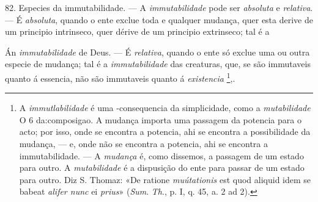 82. Especies da immutabilidade. --- A \emph{immutabilidade} pode ser \emph{absoluta} e \emph{relativa}. --- É \emph{absoluta}, quando o ente exclue toda e qualquer mudança, quer esta derive de um principio intrinseco, quer dérive de um principio extrinseco; tal é a

Án \emph{immutabilidade} de Deus. --- É \emph{relativa}, quando o ente só exclue uma ou outra especie de mudança; tal é a \emph{immutabilidade} das creaturas, que, se são immutaveis quanto á essencia, não são immutaveis quanto á \emph{existencia} \footnote{A \emph{immutlabilidade} é uma -consequencia da simplicidade, como a \emph{mutabilidade} O 6 da:composigao. A mudança importa uma passagem da potencia para o acto; por isso, onde se encontra a potencia, ahi se encontra a possibilidade da mudança, --- e, onde não se encontra a potencia, ahi se encontra a immutabilidade. --- A \emph{mudança} é, como dissemos, a passagem de um estado para outro. A \emph{mutabilidade} é a dispusição do ente para passar de um estado para outro. Diz S. Thomaz: «De ratione \emph{muútationis} est quod aliquid idem se babeat \emph{alifer nunc} ei \emph{prius}» (\emph{Sum}. \emph{Th}., p. I, q. 45, a. 2 ad 2).},.

